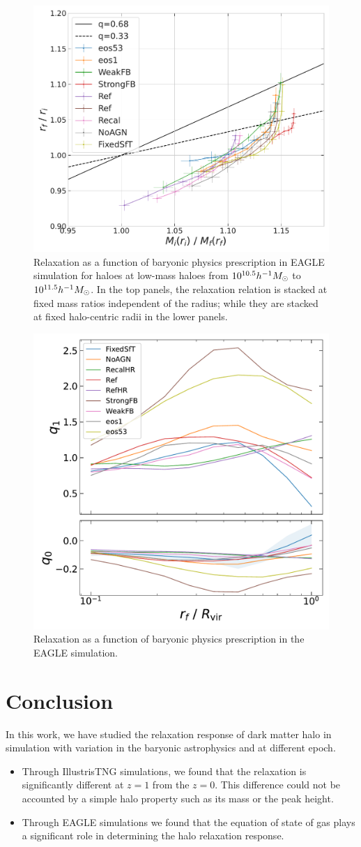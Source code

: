\begin{figure}[htbp]
\includegraphics[width=0.32\linewidth]{plots/eagle_physvar_rad_indep_relxn_reln_rf_11.5.pdf}
\caption[]{Relaxation as a function of baryonic physics prescription in EAGLE simulation for haloes at low-mass haloes from $10^{10.5} h^{-1}M_{\odot}$ to $10^{11.5} h^{-1}M_{\odot}$. In the top panels, the relaxation relation is stacked at fixed mass ratios independent of the radius; while they are stacked at fixed halo-centric radii in the lower panels.}
\label{fig:EAGLE-rad-indep}
\end{figure}

\begin{figure}[htbp]
\centering
\includegraphics[width=0.7\linewidth]{plots/fit_params_rf_M_E_physvar_fatmass_uniradb.pdf}
\caption[]{Relaxation as a function of baryonic physics prescription in the EAGLE simulation.}
\end{figure}


\section{Conclusion}
\label{sec:conclusion}
In this work, we have studied the relaxation response of dark matter halo in simulation with variation in the baryonic astrophysics and at different epoch. 
\begin{itemize}
    \item Through IllustrisTNG simulations, we found that the relaxation is significantly different at $z=1$ from the $z=0$. This difference could not be accounted by a simple halo property such as its mass or the peak height.
    \item Through EAGLE simulations we found that the equation of state of gas plays a significant role in determining the halo relaxation response.
\end{itemize}
